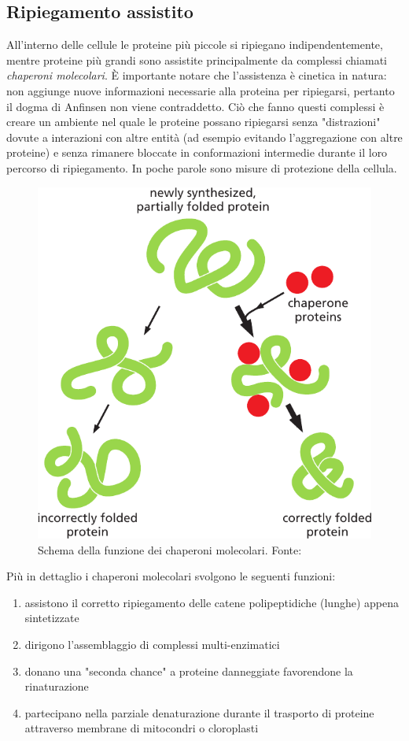 \subsection{Ripiegamento assistito}
All'interno delle cellule le proteine più piccole si ripiegano indipendentemente, mentre proteine più grandi sono assistite principalmente da complessi chiamati \textit{chaperoni molecolari}. È  importante notare che l'assistenza è cinetica in natura: non aggiunge nuove informazioni necessarie alla proteina per ripiegarsi, pertanto il dogma di Anfinsen non viene contraddetto. Ciò che fanno questi complessi è creare un ambiente nel quale le proteine possano ripiegarsi senza "distrazioni" dovute a interazioni con altre entità (ad esempio evitando l'aggregazione con altre proteine) e senza rimanere bloccate in conformazioni intermedie durante il loro percorso di ripiegamento. In poche parole sono misure di protezione della cellula. 

\begin{figure}[h]
	\centering
	\includegraphics[scale=0.4]{images/chaperone-alberts.png}
	\caption{Schema della funzione dei chaperoni molecolari. Fonte: \cite{alberts2018essential}}
	\label{fig:chaperoni}
\end{figure}

Più in dettaglio i chaperoni molecolari svolgono le seguenti funzioni:
\begin{enumerate}
	\item assistono il corretto ripiegamento delle catene polipeptidiche (lunghe) appena sintetizzate
	\item dirigono l'assemblaggio di complessi multi-enzimatici
	\item donano una "seconda chance" a proteine danneggiate favorendone la rinaturazione
	\item partecipano nella parziale denaturazione durante il trasporto di proteine attraverso membrane di mitocondri o cloroplasti
\end{enumerate}

